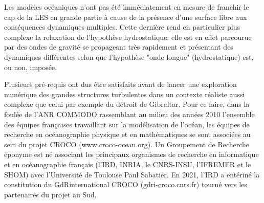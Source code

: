 Les modèles océaniques n’ont pas été immédiatement en mesure de franchir le cap de la LES en grande partie à cause de la présence d’une surface libre aux conséquences dynamiques multiples. Cette dernière rend en particulier plus complexe la relaxation de l’hypothèse hydrostatique: elle est en effet parcourue par des ondes de gravité se propageant très rapidement et présentant des dynamiques différentes selon que l'hypothèse "onde longue" (hydrostatique) est, ou non, imposée. %


Plusieurs pré-requis ont dus être satisfaits avant de lancer une exploration numérique des grandes structures turbulentes dans un contexte réaliste aussi complexe que celui par exemple du détroit de Gibraltar.
Pour ce faire, dans la foulée de l’ANR COMMODO rassemblant au milieu des années 2010 l’ensemble des équipes françaises travaillant sur la modélisation de l’océan, les équipes de recherche en océanographie physique et en mathématiques se sont associées au sein du projet CROCO (www.croco-ocean.org). Un Groupement de Recherche éponyme est né associant les principaux organismes de recherche en informatique et en océanographie français (l’IRD, INRIA, le CNRS-INSU, l’IFREMER et le SHOM) avec l'Université de Toulouse Paul Sabatier. En 2021, l’IRD a entériné la constitution du GdRinternational CROCO (gdri-croco.cnrs.fr) tourné vers les partenaires du projet au Sud. %


